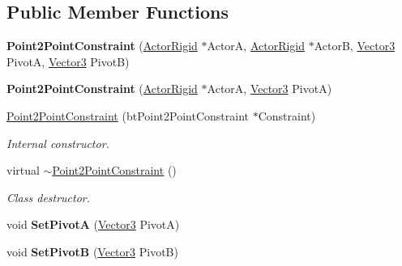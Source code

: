 \subsection*{Public Member Functions}
\begin{DoxyCompactItemize}
\item 
\hypertarget{classphys_1_1Point2PointConstraint_a817faa8a66b6193eead274668d7e3225}{
{\bfseries Point2PointConstraint} (\hyperlink{classphys_1_1ActorRigid}{ActorRigid} $\ast$ActorA, \hyperlink{classphys_1_1ActorRigid}{ActorRigid} $\ast$ActorB, \hyperlink{classphys_1_1Vector3}{Vector3} PivotA, \hyperlink{classphys_1_1Vector3}{Vector3} PivotB)}
\label{da/dfb/classphys_1_1Point2PointConstraint_a817faa8a66b6193eead274668d7e3225}

\item 
\hypertarget{classphys_1_1Point2PointConstraint_a8bcce8f4364fa9b305392082118c7f48}{
{\bfseries Point2PointConstraint} (\hyperlink{classphys_1_1ActorRigid}{ActorRigid} $\ast$ActorA, \hyperlink{classphys_1_1Vector3}{Vector3} PivotA)}
\label{da/dfb/classphys_1_1Point2PointConstraint_a8bcce8f4364fa9b305392082118c7f48}

\item 
\hyperlink{classphys_1_1Point2PointConstraint_a73c530c760f31032e23955567f634978}{Point2PointConstraint} (btPoint2PointConstraint $\ast$Constraint)
\begin{DoxyCompactList}\small\item\em Internal constructor. \item\end{DoxyCompactList}\item 
virtual \hyperlink{classphys_1_1Point2PointConstraint_aa735ad83877ff57a8a49269a87a46253}{$\sim$Point2PointConstraint} ()
\begin{DoxyCompactList}\small\item\em Class destructor. \item\end{DoxyCompactList}\item 
\hypertarget{classphys_1_1Point2PointConstraint_a2582531a664e1b05c6d50a2947dff1c5}{
void {\bfseries SetPivotA} (\hyperlink{classphys_1_1Vector3}{Vector3} PivotA)}
\label{da/dfb/classphys_1_1Point2PointConstraint_a2582531a664e1b05c6d50a2947dff1c5}

\item 
\hypertarget{classphys_1_1Point2PointConstraint_a6daf7e67fd6689dc18979fea5f745aa2}{
void {\bfseries SetPivotB} (\hyperlink{classphys_1_1Vector3}{Vector3} PivotB)}
\label{da/dfb/classphys_1_1Point2PointConstraint_a6daf7e67fd6689dc18979fea5f745aa2}


\end{DoxyCompactItemize}
